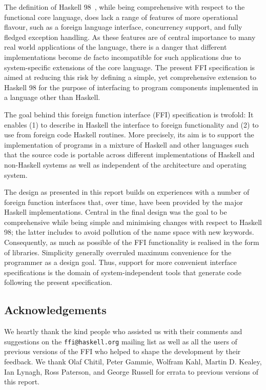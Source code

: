 \documentclass[a4paper,twoside]{article}
\newcommand{\code}[1]{\texttt{#1}}      %
\begin{document}
The definition of Haskell 98~\cite{haskell98}, while being comprehensive with
respect to the functional core language, does lack a range of features of more
operational flavour, such as a foreign language interface, concurrency
support, and fully fledged exception handling.  As these features are of
central importance to many real world applications of the language, there is a
danger that different implementations become de facto incompatible for such
applications due to system-specific extensions of the core language.  The
present FFI specification is aimed at reducing this risk by defining a simple,
yet comprehensive extension to Haskell 98 for the purpose of interfacing to
program components implemented in a language other than Haskell.

The goal behind this foreign function interface (FFI) specification is
twofold: It enables (1) to describe in Haskell the interface to foreign
functionality and (2) to use from foreign code Haskell routines.  More
precisely, its aim is to support the implementation of programs in a mixture
of Haskell and other languages such that the source code is portable across
different implementations of Haskell and non-Haskell systems as well as
independent of the architecture and operating system.

The design as presented in this report builds on experiences with a number of
foreign function interfaces that, over time, have been provided by the major
Haskell implementations.  Central in the final design was the goal to be
comprehensive while being simple and minimising changes with respect to
Haskell 98; the latter includes to avoid pollution of the name space with new
keywords.  Consequently, as much as possible of the FFI functionality is
realised in the form of libraries.  Simplicity generally overruled maximum
convenience for the programmer as a design goal.  Thus, support for more
convenient interface specifications is the domain of system-independent tools
that generate code following the present specification.

\subsection*{Acknowledgements}

We heartly thank the kind people who assisted us with their comments and
suggestions on the \code{ffi@haskell.org} mailing list as well as all the
users of previous versions of the FFI who helped to shape the development by
their feedback.  We thank Olaf Chitil, Peter Gammie, Wolfram Kahl, Martin D.
Kealey, Ian Lynagh, Ross Paterson, and George Russell for errata to previous
versions of this report.
\end{document}
